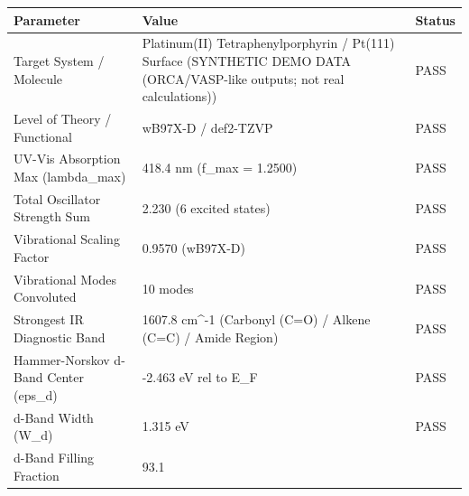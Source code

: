 \begin{tabular}{lll}
\toprule
Parameter & Value & Status \\
\midrule
Target System / Molecule & Platinum(II) Tetraphenylporphyrin / Pt(111) Surface (SYNTHETIC DEMO DATA (ORCA/VASP-like outputs; not real calculations)) & PASS \\
Level of Theory / Functional & wB97X-D / def2-TZVP & PASS \\
UV-Vis Absorption Max (lambda_max) & 418.4 nm (f_max = 1.2500) & PASS \\
Total Oscillator Strength Sum & 2.230 (6 excited states) & PASS \\
Vibrational Scaling Factor & 0.9570 (wB97X-D) & PASS \\
Vibrational Modes Convoluted & 10 modes & PASS \\
Strongest IR Diagnostic Band & 1607.8 cm^-1 (Carbonyl (C=O) / Alkene (C=C) / Amide Region) & PASS \\
Hammer-Norskov d-Band Center (eps_d) & -2.463 eV rel to E_F & PASS \\
d-Band Width (W_d) & 1.315 eV & PASS \\
d-Band Filling Fraction & 93.1%
\bottomrule
\end{tabular}

